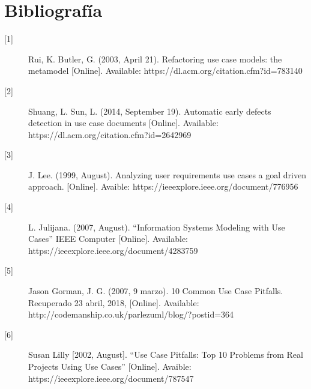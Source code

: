 \chapter{Bibliografía}

\begin{description}
	
		\item[\hypertarget{b01}{[1]}] Rui, K. Butler, G. (2003, April 21). Refactoring use case models: the metamodel [Online]. Available: https://dl.acm.org/citation.cfm?id=783140
		
		\item[\hypertarget{b02}{[2]}] Shuang, L. Sun, L. (2014, September 19). Automatic early defects detection in use case documents [Online]. Available: https://dl.acm.org/citation.cfm?id=2642969
		
		\item[\hypertarget{b03}{[3]}] 
		J. Lee. (1999, August). Analyzing user requirements use cases a goal driven approach. [Online]. Avaible: https://ieeexplore.ieee.org/document/776956
		
		\item[\hypertarget{b04}{[4]}]  L. Julijana. (2007, August). “Information Systems Modeling with Use Cases” IEEE Computer [Online]. Available:
		https://ieeexplore.ieee.org/document/4283759
		
		\item[\hypertarget{b05}{[5]}] Jason Gorman, J. G. (2007, 9 marzo). 10 Common Use Case Pitfalls. Recuperado 23 abril, 2018,  [Online]. Available: http://codemanship.co.uk/parlezuml/blog/?postid=364
		
		\item[\hypertarget{b06}{[6]}] Susan Lilly [2002, August]. “Use Case Pitfalls: Top 10 Problems from Real Projects Using Use Cases” [Online]. Avaible: https://ieeexplore.ieee.org/document/787547
		
\end{description}